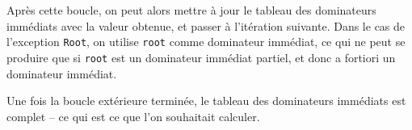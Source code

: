 \documentclass[a4paper,10pt]{article}
\begin{document}
Après cette boucle, on peut alors mettre à jour le tableau des dominateurs immédiats avec la valeur obtenue, et passer à l'itération suivante. Dans le cas de l'exception \lstinline{Root}, on utilise \lstinline{root} comme dominateur immédiat, ce qui ne peut se produire que si \lstinline{root} est un dominateur immédiat partiel, et donc a fortiori un dominateur immédiat.

Une fois la boucle extérieure terminée, le tableau des dominateurs immédiats est complet -- ce qui est ce que l'on souhaitait calculer.

%
\end{document}
